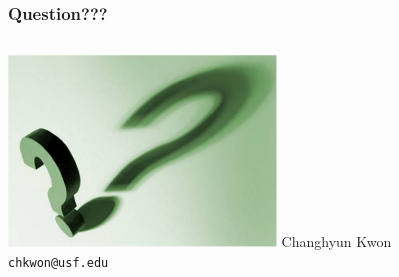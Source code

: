 \documentclass[xcolor=dvipsnames, unicode]{beamer}
\begin{document}
\begin{frame}
\frametitle{Question???}
\begin{columns}[c]
\column{1.5in}
    \includegraphics[height=2in]{question}
\column{1.5in}
    Changhyun Kwon\\
    \texttt{chkwon@usf.edu}
\end{columns}
\end{frame}


%
%
\end{document}
